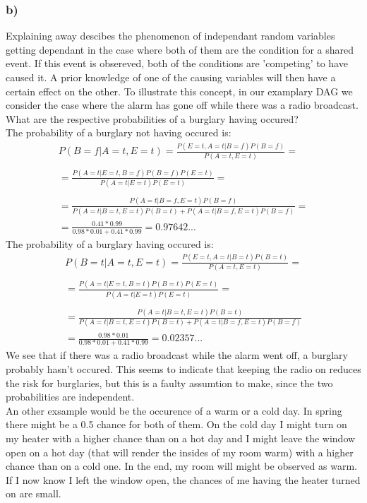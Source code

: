 \documentclass[11pt,a4paper]{article}
\begin{document}
\subsubsection*{b)}
Explaining away descibes the phenomenon of independant random variables getting dependant in the case where both of them are the condition for a shared event. If this event is obsereved, both of the conditions are 'competing' to have caused it. A prior knowledge of one of the causing variables will then have a certain effect on the other. To illustrate this concept, in our examplary DAG we consider the case where the alarm has gone off while there was a radio broadcast. What are the respective probabilities of a burglary having occured?\\
The probability of a burglary not having occured is:
\begin{equation*}
  \begin{split}
  P(B=f|A=t,E=t)  = \frac{P(E=t, A=t | B=f)P(B=f)}{P(A=t,E=t)}=\\
  \\
  =  \frac{P(A=t |E=t, B=f)P(B=f)P(E=t)}{P(A=t|E=t)P(E=t)}= \\
  \\
  =  \frac{P(A=t| B=f, E=t)P(B=f)}{P(A=t|B=t,E=t)P(B=t)+P(A=t|B=f,E=t)P(B=f)} = \\
  = \frac{0.41*0.99}{0.98*0.01+0.41*0.99}=0.97642...
  \end{split}
\end{equation*}
The probability of a burglary having occured is:
\begin{equation*}
  \begin{split}
  P(B=t|A=t,E=t)  = \frac{P(E=t, A=t | B=t)P(B=t)}{P(A=t,E=t)}= \\
  \\
  =  \frac{P(A=t |E=t, B=t)P(B=t)P(E=t)}{P(A=t|E=t)P(E=t)}= \\
  \\
  =  \frac{P(A=t| B=t, E=t)P(B=t)}{P(A=t|B=t,E=t)P(B=t)+P(A=t|B=f,E=t)P(B=f)} \\
  = \frac{0.98*0.01}{0.98*0.01+0.41*0.99}=0.02357...
  \end{split}
\end{equation*}
We see that if there was a radio broadcast while the alarm went off, a burglary probably hasn't occured. This seems to indicate that keeping the radio on reduces the risk for burglaries, but this is a faulty assumtion to make, since the two probabilities are independent.\\
An other exsample would be the occurence of a warm or a cold day. In spring there might be a 0.5 chance for both of them. On the cold day I might turn on my heater with a higher chance than on a hot day and I might leave the window open on a hot day (that will render the insides of my room warm) with a higher chance than on a cold one. In the end, my room will might be observed as warm. If I now know I left the window open, the chances of me having the heater turned on are small. 
\end{document}
